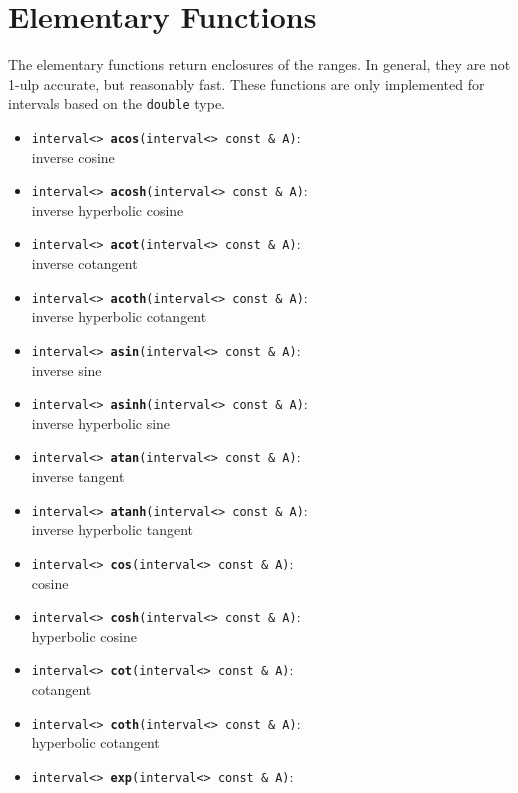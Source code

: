 \documentclass{report}
\begin{document}
\section{Elementary Functions}
The elementary functions return enclosures of the ranges. In general,
they are not 1-ulp accurate, but reasonably fast. These functions
are only implemented for intervals based on the \texttt{double} type.
\begin{itemize}	
	\item
			\texttt{interval<> {\bf acos}(interval<> const \& A)}:\\
			inverse cosine
		\item
			\texttt{interval<> {\bf acosh}(interval<> const \& A)}:\\
			inverse hyperbolic cosine
\item
			\texttt{interval<> {\bf acot}(interval<> const \& A)}:\\
			inverse cotangent
		\item
			\texttt{interval<> {\bf acoth}(interval<> const \& A)}:\\
			inverse hyperbolic cotangent
		\item
			\texttt{interval<> {\bf asin}(interval<> const \& A)}:\\
			inverse sine
		\item
			\texttt{interval<> {\bf asinh}(interval<> const \& A)}:\\
			inverse hyperbolic sine
		\item
			\texttt{interval<> {\bf atan}(interval<> const \& A)}:\\
			inverse tangent
		\item
			\texttt{interval<> {\bf atanh}(interval<> const \& A)}:\\
			inverse hyperbolic tangent
		\item
			\texttt{interval<> {\bf cos}(interval<> const \& A)}:\\
			cosine
		\item
			\texttt{interval<> {\bf cosh}(interval<> const \& A)}:\\
			hyperbolic cosine
		\item
			\texttt{interval<> {\bf cot}(interval<> const \& A)}:\\
			cotangent
		\item
			\texttt{interval<> {\bf coth}(interval<> const \& A)}:\\
			hyperbolic cotangent
		\item
			\texttt{interval<> {\bf exp}(interval<> const \& A)}:\\

\end{itemize}
\end{document}
